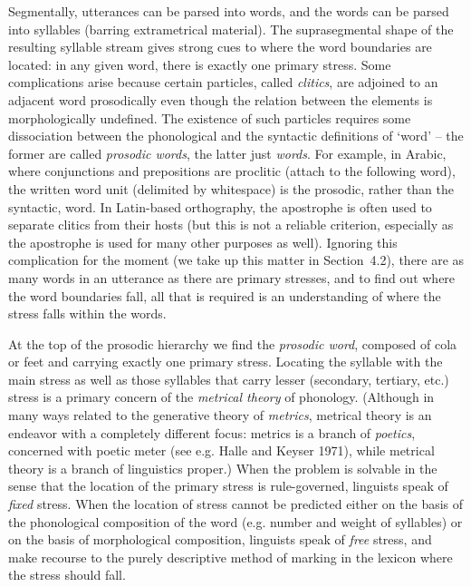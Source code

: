 Segmentally, utterances can be parsed into words, and the words can be parsed
into syllables (barring extrametrical material).  The suprasegmental shape of
the resulting syllable stream gives strong cues to where the word boundaries
are located: in any given word, there is exactly one primary stress. Some
complications arise because certain particles, called {\it clitics}, are
adjoined to an adjacent word prosodically even though the relation between the
elements is morphologically undefined. The existence of such particles
requires some dissociation between the phonological and the syntactic
definitions of `word' -- the former are called {\it prosodic words}, the
latter just {\it words}. For example, in Arabic, where conjunctions and
prepositions are proclitic (attach to the following word), the written word
unit (delimited by whitespace) is the prosodic, rather than the syntactic,
word.  In Latin-based orthography, the apostrophe is often used to separate
clitics from their hosts (but this is not a reliable criterion, especially as
the apostrophe is used for many other purposes as well).  Ignoring this
complication for the moment (we take up this matter in Section~4.2), there are as many
words in an utterance as there are primary stresses, and to find out where the
word boundaries fall, all that is required is an understanding of where the
stress falls within the words.
 
At the top of the prosodic hierarchy we find the {\it prosodic word}, composed
of cola or feet and carrying exactly one primary stress. Locating the syllable
with the main stress as well as those syllables that carry lesser (secondary,
tertiary, etc.) stress is a primary concern of the {\it metrical theory} of
phonology. (Although in many ways related to the generative theory of {\it
  metrics}, metrical theory is an endeavor with a completely different focus:
metrics is a branch of {\it poetics}, concerned with poetic meter (see
e.g. Halle and Keyser 1971), while metrical theory is a branch of linguistics
proper.)\nocite{Halle:1971} When the problem is solvable in the sense that the
location of the primary stress is rule-governed, linguists speak of {\it
  fixed} stress.  When the location of stress cannot be predicted either on the
basis of the phonological composition of the word (e.g. number and weight of
syllables) or on the basis of morphological composition, linguists speak of
{\it free} stress, and make recourse to the purely descriptive method of
marking in the lexicon where the stress should fall.

